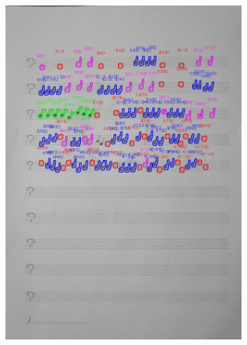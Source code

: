 \documentclass[11pt]{article}
\begin{document}
\begin{figure}[H]
    \centering
    \begin{subfigure}{.5\textwidth}
        \centering
        \graphicspath{ {blobs/} }
        \includegraphics[width=\linewidth]{17_cnts.jpg}
        \label{fig:sub1}
    \end{subfigure}%
    \begin{subfigure}{.5\textwidth}
        \centering
        \graphicspath{ {blobs/} }

\end{subfigure}
\end{figure}
\end{document}
